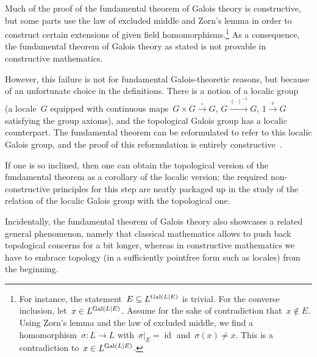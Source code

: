 \documentclass{ws-rv9x6}
\begin{document}
{Much of the proof of the fundamental theorem of Galois theory is constructive,
but some parts use the law of excluded middle and Zorn's lemma in order to
construct certain extensions of given field homomorphisms.\footnote{For
instance, the statement~$E \subseteq L^{\mathrm{Gal}(L|E)}$ is trivial. For the converse
inclusion, let~$x \in L^{\mathrm{Gal}(L|E)}$. Assume for the sake of contradiction
that~$x \not\in E$. Using Zorn's lemma and the law of excluded middle, we find
a homomorphism~$\sigma : L \to L$ with~$\sigma|_E = \operatorname{id}$
and~$\sigma(x) \neq x$. This is a contradiction to~$x \in L^{\mathrm{Gal}(L|E)}$.}
As a consequence, the fundamental theorem of Galois theory as stated is not
provable in constructive mathematics.

However, this failure is not for fundamental Galois-theoretic reasons, but because of an
unfortunate choice in the definitions. There is a notion of a localic group~\cite{wraith:localic-groups} (a
locale~$G$ equipped with continuous maps~$G \times G \xrightarrow{\circ} G$, $G
\xrightarrow{(\cdot)^{-1}} G$, $1 \xrightarrow{e} G$ satisfying the group
axioms), and the topological Galois group has a localic counterpart. The
fundamental theorem can be reformulated to refer to this localic Galois group,
and the proof of this reformulation is entirely constructive~\cite{wraith:galois-topos}.

If one is so inclined, then one can obtain the topological version of the
fundamental theorem as a corollary of the localic version; the required
non-constructive principles for this step are neatly packaged up in the study
of the relation of the localic Galois group with the topological one.


\begin{remark}Incidentally, the fundamental theorem of Galois theory also
showcases a related general phenomenon, namely that classical mathematics
allows to push back topological concerns for a bit longer,
whereas in constructive mathematics we have to embrace topology
(in a sufficiently pointfree form such as locales) from the beginning.


\end{remark}}
\end{document}
